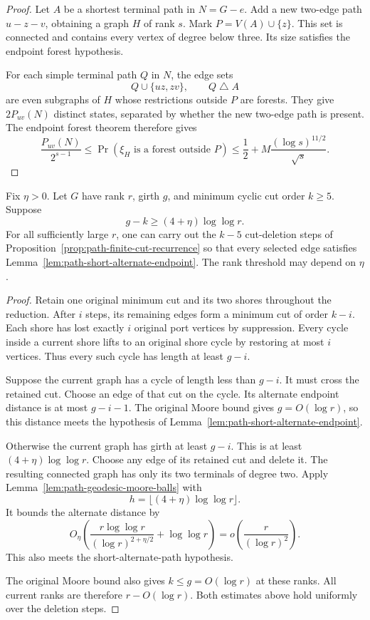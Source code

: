 \begin{proof}
Let $A$ be a shortest terminal path in $N=G-e$.
Add a new two-edge path $u-z-v$, obtaining a graph $H$ of rank $s$.
Mark $P=V(A)\cup\{z\}$.
This set is connected and contains every vertex of degree below three.
Its size satisfies the endpoint forest hypothesis.

For each simple terminal path $Q$ in $N$, the edge sets
\[
 Q\cup\{uz,zv\},\qquad Q\mathbin\triangle A
\]
are even subgraphs of $H$ whose restrictions outside $P$ are forests.
They give $2P_{uv}(N)$ distinct states, separated by whether the new two-edge path is present.
The endpoint forest theorem therefore gives
\[
 \frac{P_{uv}(N)}{2^{s-1}}
 \le\Pr(\xi_H\text{ is a forest outside }P)
 \le\frac12+M\frac{(\log s)^{11/2}}{\sqrt s}.
\]
\end{proof}

\begin{lemma}
\label{lem:path-girth-surplus-edge-selection}
Fix $\eta>0$.
Let $G$ have rank $r$, girth $g$, and minimum cyclic cut order $k\ge5$.
Suppose
\[
 g-k\ge(4+\eta)\log\log r.
\]
For all sufficiently large $r$, one can carry out the $k-5$ cut-deletion steps of Proposition~\ref{prop:path-finite-cut-recurrence} so that every selected edge satisfies Lemma~\ref{lem:path-short-alternate-endpoint}.
The rank threshold may depend on $\eta$.
\end{lemma}

\begin{proof}
Retain one original minimum cut and its two shores throughout the reduction.
After $i$ steps, its remaining edges form a minimum cut of order $k-i$.
Each shore has lost exactly $i$ original port vertices by suppression.
Every cycle inside a current shore lifts to an original shore cycle by restoring at most $i$ vertices.
Thus every such cycle has length at least $g-i$.

Suppose the current graph has a cycle of length less than $g-i$.
It must cross the retained cut.
Choose an edge of that cut on the cycle.
Its alternate endpoint distance is at most $g-i-1$.
The original Moore bound gives $g=O(\log r)$, so this distance meets the hypothesis of Lemma~\ref{lem:path-short-alternate-endpoint}.

Otherwise the current graph has girth at least $g-i$.
This is at least $(4+\eta)\log\log r$.
Choose any edge of its retained cut and delete it.
The resulting connected graph has only its two terminals of degree two.
Apply Lemma~\ref{lem:path-geodesic-moore-balls} with
\[
 h=\lfloor(4+\eta)\log\log r\rfloor.
\]
It bounds the alternate distance by
\[
 O_\eta\!\left(
 \frac{r\log\log r}{(\log r)^{2+\eta/2}}
 +\log\log r\right)
 =o\!\left(\frac r{(\log r)^2}\right).
\]
This also meets the short-alternate-path hypothesis.

The original Moore bound also gives $k\le g=O(\log r)$ at these ranks.
All current ranks are therefore $r-O(\log r)$.
Both estimates above hold uniformly over the deletion steps.
\end{proof}

